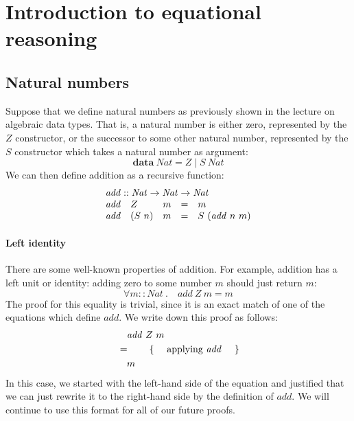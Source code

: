 \section{Introduction to equational reasoning}
\label{sec:lecture-10}

\subsection{Natural numbers}

Suppose that we define natural numbers as previously shown in the lecture on algebraic data types. That is, a natural number is either zero, represented by the $Z$ constructor, or the successor to some other natural number, represented by the $S$ constructor which takes a natural number as argument:
\begin{displaymath}
\mathbf{data}~\mathit{Nat} = Z \mid S~\mathit{Nat}
\end{displaymath}
We can then define addition as a recursive function:
\begin{displaymath}
\begin{array}{lllcl}
\multicolumn{5}{l}{\mathit{add} :: \mathit{Nat} \to \mathit{Nat} \to \mathit{Nat}} \\
\mathit{add} & Z & m & = & m \\
\mathit{add} & (S~n) & m & = & S~(\mathit{add}~n~m)
\end{array}
\end{displaymath}

\paragraph{Left identity}

There are some well-known properties of addition. For example, addition has a left unit or identity: adding zero to some number $m$ should just return $m$:
\begin{displaymath}
\forall m :: \mathit{Nat} ~.\quad \mathit{add}~Z~m = m
\end{displaymath}
The proof for this equality is trivial, since it is an exact match of one of the equations which define $\mathit{add}$. We write down this proof as follows:
\begin{align*}
&\quad \mathit{add}~Z~m\\
&=\qquad\text{\{\quad\ applying $\mathit{add}$ \quad\}}\\
&\quad m
\end{align*}
In this case, we started with the left-hand side of the equation and justified that we can just rewrite it to the right-hand side by the definition of $\mathit{add}$. We will continue to use this format for all of our future proofs.

